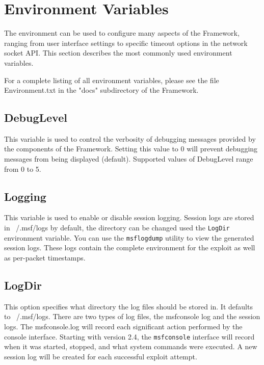 \documentclass{report}
\begin{document}
    \section{Environment Variables}
    \label{ENV-VAR}
\par
The environment can be used to configure many aspects of the Framework, ranging
from user interface settings to specific timeout options in the network socket
API. This section describes the most commonly used environment variables.  

\par
For a complete listing of all environment variables, please see the file
Environment.txt in the "docs" subdirectory of the Framework. 


	\subsection{DebugLevel}
\par
This variable is used to control the verbosity of debugging messages provided by
the components of the Framework. Setting this value to 0 will prevent debugging
messages from being displayed (default). Supported values of DebugLevel range from 0 to 5. 

	\subsection{Logging}
\par
This variable is used to enable or disable session logging. Session logs are
stored in ~/.msf/logs by default, the directory can be changed used the
\texttt{LogDir} environment variable. You can use the \texttt{msflogdump}
utility to view the generated session logs. These logs contain the complete
environment for the exploit as well as per-packet timestamps. 

	\subsection{LogDir}
\par
This option specifies what directory the log files should be stored in. It
defaults to ~/.msf/logs. There are two types of log files, the msfconsole log and the
session logs. The msfconsole.log will record each significant action performed by the
console interface. Starting with version 2.4, the \texttt{msfconsole} interface will
record when it was started, stopped, and what system commands were executed. A
new session log will be created for each successful exploit attempt. 
\end{document}

